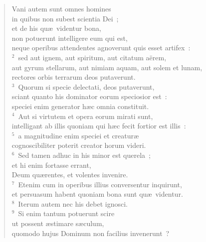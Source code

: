 \begin{flushleft}\begin{verse}\vspace{-19pt}\hspace{6pt}Vani autem sunt omnes homines\\\hspace{6pt} in quibus non subest scientia Dei~;\\ et de his qu\ae\ videntur bona,\\ non potuerunt intelligere eum qui est,\\ neque operibus attendentes agnoverunt quis esset artifex~:\\
${}^{2}$~sed aut ignem, aut spiritum, aut citatum a\"erem,\\ aut gyrum stellarum, aut nimiam aquam, aut solem et lunam,\\ rectores orbis terrarum deos putaverunt.\\
${}^{3}$~Quorum si specie delectati, deos putaverunt,\\ sciant quanto his dominator eorum speciosior est~:\\ speciei enim generator h\ae c omnia constituit.\\
${}^{4}$~Aut si virtutem et opera eorum mirati sunt,\\ intelligant ab illis quoniam qui h\ae c fecit fortior est illis~:\\
${}^{5}$~a magnitudine enim speciei et creatur\ae \\ cognoscibiliter poterit creator horum videri.\\
${}^{6}$~Sed tamen adhuc in his minor est querela~;\\ et hi enim fortasse errant,\\ Deum qu\ae rentes, et volentes invenire.\\
${}^{7}$~Etenim cum in operibus illius conversentur inquirunt,\\ et persuasum habent quoniam bona sunt qu\ae\ videntur.\\
${}^{8}$~Iterum autem nec his debet ignosci.\\
${}^{9}$~Si enim tantum potuerunt scire\\ ut possent \ae stimare s\ae culum,\\ quomodo hujus Dominum non facilius invenerunt~?\end{verse}\end{flushleft}



